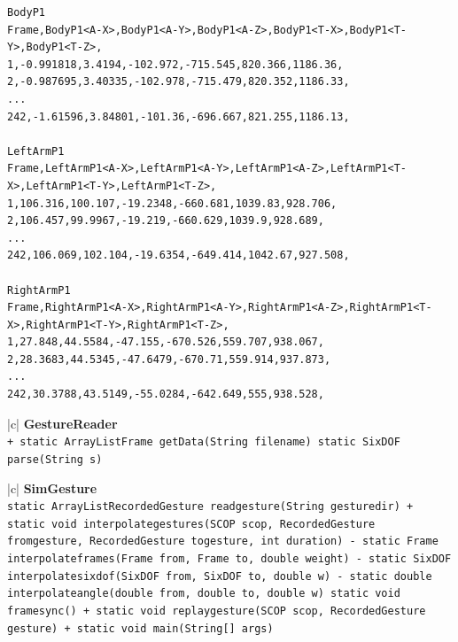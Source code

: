 \documentclass[12pt,a4,notitlepage]{report}
\renewcommand{\_}{\texttt{\symbol{95}}}
\newcommand{\<}{\texttt{\symbol{60}}}
\renewcommand{\>}{\texttt{\symbol{62}}}
\newcommand{\class}[1]{\textbf{#1}}
\newcommand{\variable}[1]{\texttt{#1}}
\begin{document}
{\scriptsize
\begin{verbatim}
BodyP1
Frame,BodyP1<A-X>,BodyP1<A-Y>,BodyP1<A-Z>,BodyP1<T-X>,BodyP1<T-Y>,BodyP1<T-Z>,
1,-0.991818,3.4194,-102.972,-715.545,820.366,1186.36,
2,-0.987695,3.40335,-102.978,-715.479,820.352,1186.33,
...
242,-1.61596,3.84801,-101.36,-696.667,821.255,1186.13,

LeftArmP1
Frame,LeftArmP1<A-X>,LeftArmP1<A-Y>,LeftArmP1<A-Z>,LeftArmP1<T-X>,LeftArmP1<T-Y>,LeftArmP1<T-Z>,
1,106.316,100.107,-19.2348,-660.681,1039.83,928.706,
2,106.457,99.9967,-19.219,-660.629,1039.9,928.689,
...
242,106.069,102.104,-19.6354,-649.414,1042.67,927.508,

RightArmP1
Frame,RightArmP1<A-X>,RightArmP1<A-Y>,RightArmP1<A-Z>,RightArmP1<T-X>,RightArmP1<T-Y>,RightArmP1<T-Z>,
1,27.848,44.5584,-47.155,-670.526,559.707,938.067,
2,28.3683,44.5345,-47.6479,-670.71,559.914,937.873,
...
242,30.3788,43.5149,-55.0284,-642.649,555,938.528,
\end{verbatim}
}


\begin{tabular}{|c|} \hline 
\class{GestureReader} \\ \hline
{}
{ \variable{+ static ArrayList\<Frame\> getData(String filename) \newline
static SixDOF parse(String s)
} } \\ \hline
\end{tabular}

\begin{tabular}{|c|} \hline 
\class{SimGesture} \\ \hline
{}
{ \variable{static ArrayList\<RecordedGesture\> read\_gesture(String gesture\_dir) \newline
+ static void interpolate\_gestures(SCOP scop, RecordedGesture from\_gesture, RecordedGesture to\_gesture, int duration) \newline
- static Frame interpolate\_frames(Frame from, Frame to, double weight) \newline
- static SixDOF interpolate\_sixdof(SixDOF from, SixDOF to, double w) \newline
- static double interpolate\_angle(double from, double to, double w) \newline
static void framesync() \newline
+ static void replay\_gesture(SCOP scop, RecordedGesture gesture) \newline
+ static void main(String[] args)
} } \\ \hline
\end{tabular}
\end{document}
